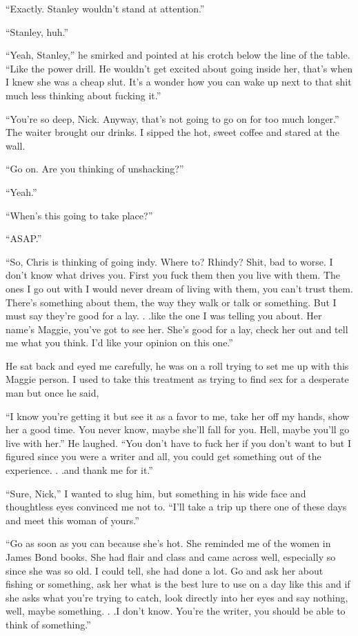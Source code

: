 ``Exactly. Stanley wouldn't stand at attention.''

``Stanley, huh.''

``Yeah, Stanley,'' he smirked and pointed at his crotch below the line
of the table. ``Like the power drill. He wouldn't get excited about
going inside her, that's when I knew she was a cheap slut. It's a wonder
how you can wake up next to that shit much less thinking about fucking
it.''

``You're so deep, Nick. Anyway, that's not going to go on for too much
longer.'' The waiter brought our drinks. I sipped the hot, sweet coffee
and stared at the wall.

``Go on. Are you thinking of unshacking?''

``Yeah.''

``When's this going to take place?''

``ASAP.''

``So, Chris is thinking of going indy. Where to? Rhindy? Shit, bad to
worse. I don't know what drives you. First you fuck them then you live
with them. The ones I go out with I would never dream of living with
them, you can't trust them. There's something about them, the way they
walk or talk or something. But I must say they're good for a lay. .
.like the one I was telling you about. Her name's Maggie, you've got to
see her. She's good for a lay, check her out and tell me what you think.
I'd like your opinion on this one.''

He sat back and eyed me carefully, he was on a roll trying to set me up
with this Maggie person. I used to take this treatment as trying to find
sex for a desperate man but once he said,

``I know you're getting it but see it as a favor to me, take her off my
hands, show her a good time. You never know, maybe she'll fall for you.
Hell, maybe you'll go live with her.'' He laughed. ``You don't have to
fuck her if you don't want to but I figured since you were a writer and
all, you could get something out of the experience. . .and thank me for
it.''

``Sure, Nick,'' I wanted to slug him, but something in his wide face and
thoughtless eyes convinced me not to. ``I'll take a trip up there one of
these days and meet this woman of yours.''

``Go as soon as you can because she's hot. She reminded me of the women
in James Bond books. She had flair and class and came across well,
especially so since she was so old. I could tell, she had done a lot. Go
and ask her about fishing or something, ask her what is the best lure to
use on a day like this and if she asks what you're trying to catch, look
directly into her eyes and say nothing, well, maybe something. . .I
don't know. You're the writer, you should be able to think of
something.''

